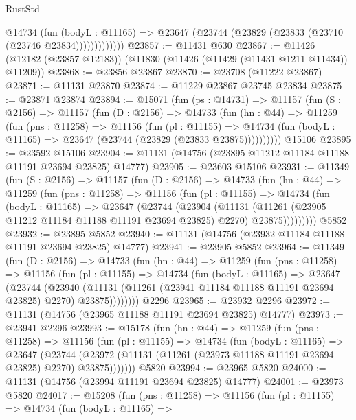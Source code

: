 \begin{lexlean}{RustStd}
\begin{coremodule}
                @14734
                  (fun (bodyL : @11165) =>
                  @23647 (@23744 (@23829 (@23833 (@23710 (@23746 @23834)))))))))))))
@23857 := @11431 @630
@23867 := @11426 (@12182 (@23857 @12183)) (@11830 (@11426 (@11429 (@11431 @1211 @11434)) @11209))
@23868 := @23856 @23867
@23870 := @23708 (@11222 @23867)
@23871 := @11131 @23870
@23874 := @11229 @23867 @23745 @23834
@23875 := @23871 @23874
@23894 := @15071
    (fun (ps : @14731) =>
    @11157
      (fun (S : @2156) =>
      @11157
        (fun (D : @2156) =>
        @14733
          (fun (hn : @44) =>
          @11259
            (fun (pns : @11258) =>
            @11156
              (fun (pl : @11155) =>
              @14734 (fun (bodyL : @11165) => @23647 (@23744 (@23829 (@23833 @23875))))))))))
    @15106
@23895 := @23592 @15106
@23904 := @11131 (@14756 (@23895 @11212 @11184 @11188 @11191 @23694 @23825) @14777)
@23905 := @23603 @15106
@23931 := @11349
    (fun (S : @2156) =>
    @11157
      (fun (D : @2156) =>
      @14733
        (fun (hn : @44) =>
        @11259
          (fun (pns : @11258) =>
          @11156
            (fun (pl : @11155) =>
            @14734
              (fun (bodyL : @11165) =>
              @23647
                (@23744
                  (@23904
                    (@11131
                      (@11261 (@23905 @11212 @11184 @11188 @11191 @23694 @23825) @2270)
                      @23875)))))))))
    @5852
@23932 := @23895 @5852
@23940 := @11131 (@14756 (@23932 @11184 @11188 @11191 @23694 @23825) @14777)
@23941 := @23905 @5852
@23964 := @11349
    (fun (D : @2156) =>
    @14733
      (fun (hn : @44) =>
      @11259
        (fun (pns : @11258) =>
        @11156
          (fun (pl : @11155) =>
          @14734
            (fun (bodyL : @11165) =>
            @23647
              (@23744
                (@23940
                  (@11131 (@11261 (@23941 @11184 @11188 @11191 @23694 @23825) @2270) @23875))))))))
    @2296
@23965 := @23932 @2296
@23972 := @11131 (@14756 (@23965 @11188 @11191 @23694 @23825) @14777)
@23973 := @23941 @2296
@23993 := @15178
    (fun (hn : @44) =>
    @11259
      (fun (pns : @11258) =>
      @11156
        (fun (pl : @11155) =>
        @14734
          (fun (bodyL : @11165) =>
          @23647
            (@23744
              (@23972 (@11131 (@11261 (@23973 @11188 @11191 @23694 @23825) @2270) @23875)))))))
    @5820
@23994 := @23965 @5820
@24000 := @11131 (@14756 (@23994 @11191 @23694 @23825) @14777)
@24001 := @23973 @5820
@24017 := @15208
    (fun (pns : @11258) =>
    @11156
      (fun (pl : @11155) =>
      @14734
        (fun (bodyL : @11165) =>

\end{coremodule}
\end{lexlean}
